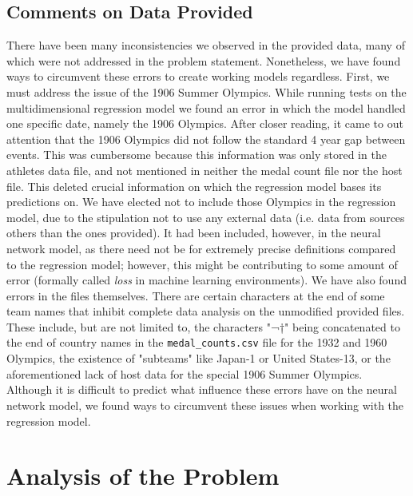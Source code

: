 \documentclass{mcmthesis}
\begin{document}
\subsection{Comments on Data Provided}
There have been many inconsistencies we observed in the provided data, many of which were not addressed in the problem statement. Nonetheless, we have found ways to circumvent these errors to create working models regardless. First, we must address the issue of the 1906 Summer Olympics. While running tests on the multidimensional regression model we found an error in which the model handled one specific date, namely the 1906 Olympics. After closer reading, it came to out attention that the 1906 Olympics did not follow the standard 4 year gap between events. This was cumbersome because this information was only stored in the athletes data file, and not mentioned in neither the medal count file nor the host file. This deleted crucial information on which the regression model bases its predictions on. We have elected not to include those Olympics in the regression model, due to the stipulation not to use any external data (i.e. data from sources others than the ones provided). It had been included, however, in the neural network model, as there need not be for extremely precise definitions compared to the regression model; however, this might be contributing to some amount of error (formally called \textit{loss} in machine learning environments).
We have also found errors in the files themselves. There are certain characters at the end of some team names that inhibit complete data analysis on the unmodified provided files. These include, but are not limited to, the characters "¬†" being concatenated to the end of country names in the \texttt{medal\_counts.csv} file for the 1932 and 1960 Olympics, the existence of "subteams" like Japan-1 or United States-13, or the aforementioned lack of host data for the special 1906 Summer Olympics. Although it is difficult to predict what influence these errors have on the neural network model, we found ways to circumvent these issues when working with the regression model. 

\section{Analysis of the Problem}
\end{document}
